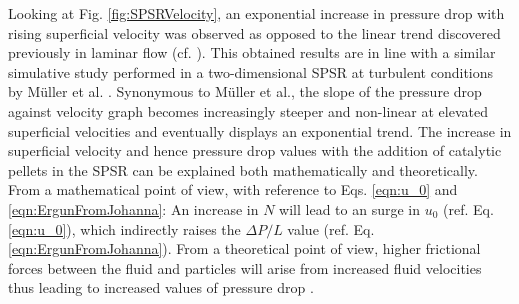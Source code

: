 
Looking at Fig. \ref{fig:SPSRVelocity}, an exponential increase in pressure drop with rising superficial velocity was observed as opposed to the linear trend discovered previously in laminar flow (cf. \cite{Fernengel2020}). This obtained results are in line with a similar simulative study performed in a two-dimensional SPSR at turbulent conditions by M\"{u}ller et al. \cite{Mueller2012}. Synonymous to M\"{u}ller et al., the slope of the pressure drop against velocity graph becomes increasingly steeper and non-linear at elevated superficial velocities and eventually displays an exponential trend. The increase in superficial velocity and hence pressure drop values with the addition of catalytic pellets in the SPSR can be explained both mathematically and theoretically. From a mathematical point of view, with reference to Eqs. \ref{eqn:u_0} and \ref{eqn:ErgunFromJohanna}: An increase in $N$ will lead to an surge in $u_0$ (ref. Eq. \ref{eqn:u_0}), which indirectly raises the $\Delta P/L$ value (ref. Eq. \ref{eqn:ErgunFromJohanna}). From a theoretical point of view, higher frictional forces between the fluid and particles will arise from increased fluid velocities thus leading to increased values of pressure drop \cite{Mueller2012}.

